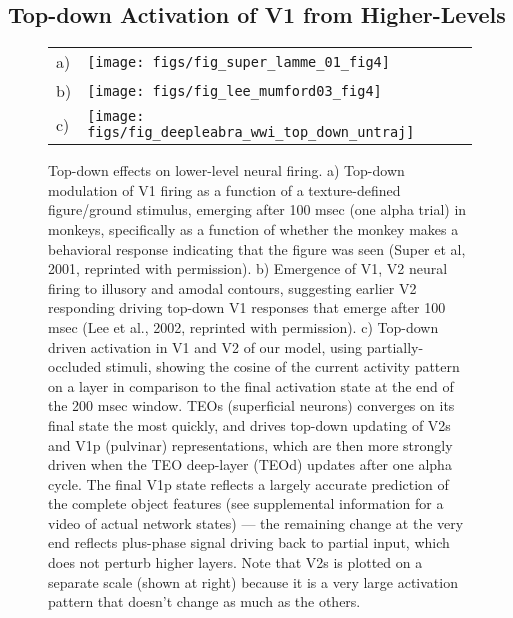 \documentclass[11pt,twoside]{article}
\newif\myifpdf
\begin{document}
\subsection{Top-down Activation of V1 from Higher-Levels}

\begin{figure}
  \begin{center}
    \begin{tabular}{ll}
      \parbox[b]{.1em}{a) \vspace*{1.4in}} &
      \texttt{[image: figs/fig\_super\_lamme\_01\_fig4]} \\
      \parbox[b]{.1em}{b) \vspace*{1.4in}} &
      \texttt{[image: figs/fig\_lee\_mumford03\_fig4]} \\
      \parbox[b]{.1em}{c) \vspace*{1.4in}} &
      \texttt{[image: figs/fig\_deepleabra\_wwi\_top\_down\_untraj]}
    \end{tabular}
  \end{center}
  \caption{\footnotesize Top-down effects on lower-level neural firing.  a) Top-down modulation of V1 firing as a function of a texture-defined figure/ground stimulus, emerging after 100 msec (one alpha trial) in monkeys, specifically as a function of whether the monkey makes a behavioral response indicating that the figure was seen (Super et al, 2001, reprinted with permission).  b) Emergence of V1, V2 neural firing to illusory and amodal contours, suggesting earlier V2 responding driving top-down V1 responses that emerge after 100 msec (Lee et al., 2002, reprinted with permission).  c) Top-down driven activation in V1 and V2 of our model, using partially-occluded stimuli, showing the cosine of the current activity pattern on a layer in comparison to the final activation state at the end of the 200 msec window.  TEOs (superficial neurons) converges on its final state the most quickly, and drives top-down updating of V2s and V1p (pulvinar) representations, which are then more strongly driven when the TEO deep-layer (TEOd) updates after one alpha cycle.  The final V1p state reflects a largely accurate prediction of the complete object features (see supplemental information for a video of actual network states) --- the remaining change at the very end reflects plus-phase signal driving back to partial input, which does not perturb higher layers.  Note that V2s is plotted on a separate scale (shown at right) because it is a very large activation pattern that doesn't change as much as the others.}
  \label{fig.top_down}
\end{figure}
\end{document}
